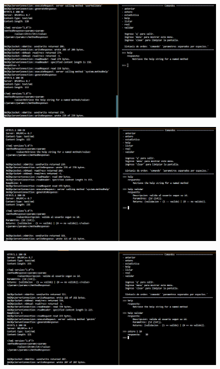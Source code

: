 \documentclass[a4paper,12pt]{article}
\begin{document}
\begin{figure}[htbp]
    \begin{adjustbox}{max width=\textwidth, center}
        \includegraphics{C5/Servidor_cliente_3.PNG}
    \end{adjustbox}
\end{figure}
\begin{figure}[htbp]
    \begin{adjustbox}{max width=\textwidth, center}
        \includegraphics{C5/Servidor_cliente_4.PNG}
    \end{adjustbox}
\end{figure}
\begin{figure}[htbp]
    \begin{adjustbox}{max width=\textwidth, center}
        \includegraphics{C5/Servidor_cliente_5.PNG}
    \end{adjustbox}
\end{figure}
\end{document}

